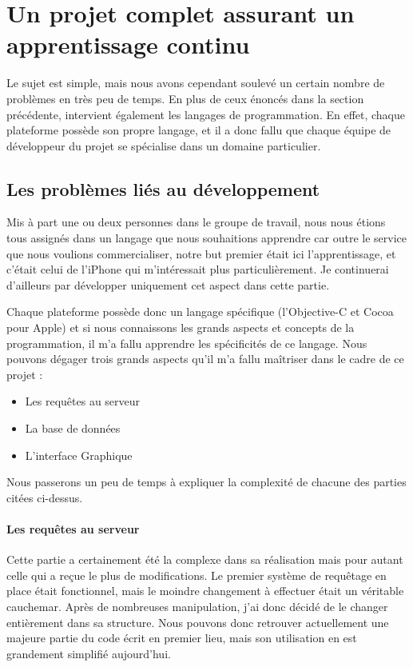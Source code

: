 \documentclass{article}
\begin{document}
\section{Un projet complet assurant un apprentissage continu}
	
Le sujet est simple, mais nous avons cependant soulevé un certain nombre de problèmes en très peu de temps. En plus de ceux énoncés dans la section précédente, intervient également les langages de programmation. En effet, chaque plateforme possède son propre langage, et il a donc fallu que chaque équipe de développeur du projet se spécialise dans un domaine particulier. 

\subsection{Les problèmes liés au développement}
Mis à part une ou deux personnes dans le groupe de travail, nous nous étions tous assignés dans un langage que nous souhaitions apprendre car outre le service que nous voulions commercialiser, notre but premier était ici l'apprentissage, et c'était celui de l'iPhone qui m'intéressait plus particulièrement. Je continuerai d'ailleurs par développer uniquement cet aspect dans cette partie.

Chaque plateforme possède donc un langage spécifique (l'Objective-C et Cocoa pour Apple) et si nous connaissons les grands aspects et concepts de la programmation, il m'a fallu apprendre les spécificités de ce langage. Nous pouvons dégager trois grands aspects qu'il m'a fallu maîtriser dans le cadre de ce projet : 
\begin{itemize}
	\item Les requêtes au serveur
	\item La base de données
	\item L'interface Graphique
\end{itemize}
Nous passerons un peu de temps à expliquer la complexité de chacune des parties citées ci-dessus.
		\paragraph{Les requêtes au serveur}
		Cette partie a certainement été la complexe dans sa réalisation mais pour autant celle qui a  re\c cue le plus de modifications. Le premier système de requêtage en place était fonctionnel, mais le moindre changement à effectuer était un véritable cauchemar. Après de nombreuses manipulation, j'ai donc décidé de le changer entièrement dans sa structure. Nous pouvons donc retrouver actuellement une majeure partie du code écrit en premier lieu, mais son utilisation en est grandement simplifié aujourd'hui.
		
\end{document}

